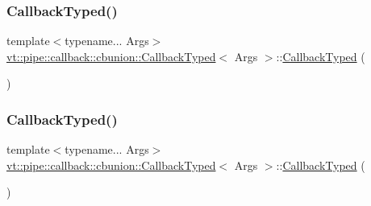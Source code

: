 \mbox{\label{structvt_1_1pipe_1_1callback_1_1cbunion_1_1_callback_typed_afb15554d9e94dd6714ddfc0bf88e848c}} 
\subsubsection{\texorpdfstring{Callback\+Typed()}{CallbackTyped()}\hspace{0.1cm}{\footnotesize\ttfamily [2/12]}}
{\footnotesize\ttfamily template$<$typename... Args$>$ \\
\hyperlink{structvt_1_1pipe_1_1callback_1_1cbunion_1_1_callback_typed}{vt\+::pipe\+::callback\+::cbunion\+::\+Callback\+Typed}$<$ Args $>$\+::\hyperlink{structvt_1_1pipe_1_1callback_1_1cbunion_1_1_callback_typed}{Callback\+Typed} (\begin{DoxyParamCaption}\item[{\hyperlink{structvt_1_1pipe_1_1callback_1_1cbunion_1_1_callback_typed}{Callback\+Typed}$<$ Args $>$ const \&}]{ }\end{DoxyParamCaption})\hspace{0.3cm}{\ttfamily [default]}}

\mbox{\label{structvt_1_1pipe_1_1callback_1_1cbunion_1_1_callback_typed_a156131d8b268766113f8c2dd81b6a199}} 
\subsubsection{\texorpdfstring{Callback\+Typed()}{CallbackTyped()}\hspace{0.1cm}{\footnotesize\ttfamily [3/12]}}
{\footnotesize\ttfamily template$<$typename... Args$>$ \\
\hyperlink{structvt_1_1pipe_1_1callback_1_1cbunion_1_1_callback_typed}{vt\+::pipe\+::callback\+::cbunion\+::\+Callback\+Typed}$<$ Args $>$\+::\hyperlink{structvt_1_1pipe_1_1callback_1_1cbunion_1_1_callback_typed}{Callback\+Typed} (\begin{DoxyParamCaption}\item[{\hyperlink{structvt_1_1pipe_1_1callback_1_1cbunion_1_1_callback_typed}{Callback\+Typed}$<$ Args $>$ \&\&}]{ }\end{DoxyParamCaption})\hspace{0.3cm}{\ttfamily [default]}}

